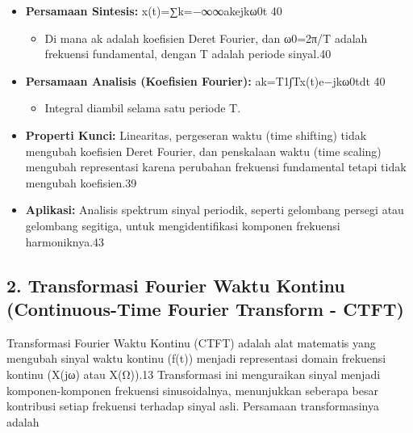 \documentclass[
  letterpaper,
  DIV=11,
  numbers=noendperiod]{scrreprt}
\providecommand{\tightlist}{%
  \setlength{\itemsep}{0pt}\setlength{\parskip}{0pt}}\usepackage{longtable,booktabs,array}
\begin{document}
\begin{itemize}
\item
  \textbf{Persamaan Sintesis:}
  x(t)=∑k=−∞∞\hspace{0pt}ak\hspace{0pt}ejkω0\hspace{0pt}t 40

  \begin{itemize}
  \tightlist
  \item
    Di mana ak\hspace{0pt} adalah koefisien Deret Fourier, dan
    ω0\hspace{0pt}=2π/T adalah frekuensi fundamental, dengan T adalah
    periode sinyal.40
  \end{itemize}
\item
  \textbf{Persamaan Analisis (Koefisien Fourier):}
  ak\hspace{0pt}=T1\hspace{0pt}∫T\hspace{0pt}x(t)e−jkω0\hspace{0pt}tdt
  40

  \begin{itemize}
  \tightlist
  \item
    Integral diambil selama satu periode T.
  \end{itemize}
\item
  \textbf{Properti Kunci:} Linearitas, pergeseran waktu (time shifting)
  tidak mengubah koefisien Deret Fourier, dan penskalaan waktu (time
  scaling) mengubah representasi karena perubahan frekuensi fundamental
  tetapi tidak mengubah koefisien.39
\item
  \textbf{Aplikasi:} Analisis spektrum sinyal periodik, seperti
  gelombang persegi atau gelombang segitiga, untuk mengidentifikasi
  komponen frekuensi harmoniknya.43
\end{itemize}

\subsection{2. Transformasi Fourier Waktu Kontinu (Continuous-Time
Fourier Transform -
CTFT)}\label{transformasi-fourier-waktu-kontinu-continuous-time-fourier-transform---ctft}

Transformasi Fourier Waktu Kontinu (CTFT) adalah alat matematis yang
mengubah sinyal waktu kontinu (f(t)) menjadi representasi domain
frekuensi kontinu (X(jω) atau X(Ω)).13 Transformasi ini menguraikan
sinyal menjadi komponen-komponen frekuensi sinusoidalnya, menunjukkan
seberapa besar kontribusi setiap frekuensi terhadap sinyal asli.
Persamaan transformasinya adalah
\end{document}
